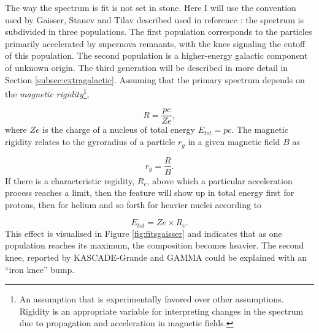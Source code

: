 The way the spectrum is fit is not set in stone. Here I will use the convention used by Gaisser, Stanev and Tilav described used in reference \cite{Gaisser:2013bla}: the spectrum is subdivided in three populations. The first population corresponds to the particles primarily accelerated by supernova remnants, with the knee signaling the cutoff of this population. The second population is a higher-energy galactic component of unknown origin. The third generation will be described in more detail in Section \ref{subsec:extragalactic}. Assuming that the primary spectrum depends on the \textit{magnetic rigidity}\footnote{An assumption that is experimentally favored over other assumptions. Rigidity is an appropriate variable for interpreting changes in the spectrum due to propagation and acceleration in magnetic fields.},

\begin{equation}
R = \frac{pc}{Ze},
\end{equation}
where $Ze$ is the charge of a nucleus of total energy $E_{tot} = pc$. The magnetic rigidity relates to the gyroradius of a particle $r_g$ in a given magnetic field $B$ as

\begin{equation}
\label{eq:gyro}
r_g = \frac{R}{B}.
\end{equation}
If there is a characteristic regidity, $R_e$, above which a particular acceleration process reaches a limit, then the feature will show up in total energy first for protons, then for helium and so forth for heavier nuclei according to

\begin{equation}
E_{tot} = Ze \times R_e.
\end{equation}
This effect is visualised in Figure \ref{fig:fitsgaisser} and indicates that as one population reaches its maximum, the composition becomes heavier. The second knee, reported by KASCADE-Grande \cite{Apel:2011mi} and GAMMA \cite{Garyaka:2008gs} could be explained with an ``iron knee'' bump.

